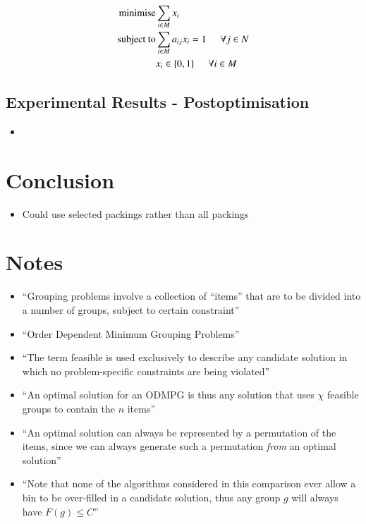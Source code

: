 \documentclass{elsarticle}
\begin{document}
\begin{align*}
\text{minimise} &\sum_{i \in M} x_i \\
\text{subject to} &\sum_{i \in M} a_{ij} x_i = 1 \hspace{5mm} \forall j \in N \\
&x_i \in \{0,1\} \hspace{5mm} \forall i \in M
\end{align*}

\subsection{Experimental Results - Postoptimisation}
\begin{itemize}
	\item
\end{itemize}

\section{Conclusion}
\begin{itemize}
	\item Could use selected packings rather than all packings
\end{itemize}

\section{Notes}
\begin{itemize}
	\item ``Grouping problems involve a collection of ``items'' that are to be divided into a number of groups, subject to certain constraint'' \cite{lewis2009}
	\item ``Order Dependent Minimum Grouping Problems'' \cite{lewis2009}
	\item ``The term feasible is used exclusively to describe any candidate solution in which no problem-specific constraints are being violated'' \cite{lewis2009}
	\item ``An optimal solution for an ODMPG is thus any solution that uses $\chi$ feasible groups to contain the $n$ items'' \cite{lewis2009}
	\item ``An optimal solution can always be represented by a permutation of the items, since we can always generate such a permutation \textit{from} an optimal solution'' \cite{lewis2009}
	\item ``Note that none of the algorithms considered in this comparison ever allow a bin to be over-filled in a candidate solution, thus any group $g$ will always have $F(g) \leq C$'' \cite{lewis2009}
\end{itemize}	
\end{document}
